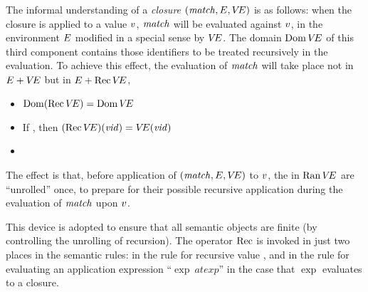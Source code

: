 The informal understanding of a {\sl {} closure} $({\it match},E,\mbox{$V\!E$})$ is as follows:
when the  closure is applied to a value $v$,
${\it match}$ will be evaluated against $v$, in the environment $E$ modified in
a special sense by
$\mbox{$V\!E$}$.  The domain $\mathop{\rm Dom}\nolimits\mbox{$V\!E$}$ of this third component contains those identifiers to be treated recursively in the evaluation.  To achieve this
effect, the evaluation of ${\it match}$ will take place not in $E + \mbox{$V\!E$}$
but in $E + \mathop{\rm Rec}\nolimits\mbox{$V\!E$}$,
\medskip

\begin{itemize}
\item $\mathop{\rm Dom}\nolimits(\mathop{\rm Rec}\nolimits\mbox{$V\!E$})=\mathop{\rm Dom}\nolimits\mbox{$V\!E$} $
\item If \replacement{\theidstatus}{$\VE(\var)\notin\Closure$}{$\VE(\vid)\notin\FcnClosure\times\{\isv\}$},
then $(\mathop{\rm Rec}\nolimits\mbox{$V\!E$})({\it vid})=\mbox{$V\!E$}({\it vid})$
\item {}
\end{itemize}
The effect is that, before application of $({\it match},E,\mbox{$V\!E$})$ to $v$, the
in $\mathop{\rm Ran}\nolimits\mbox{$V\!E$}$ are ``unrolled'' once, to prepare for their possible
recursive application during the evaluation of ${\it match}$ upon $v$.

This device is adopted to ensure that all semantic objects are finite (by
controlling the unrolling of recursion).  The operator $\mathop{\rm Rec}\nolimits$ is invoked in
just two places in the semantic rules: in the rule for recursive value
, and in the rule for evaluating
an application expression ``$\exp\ atexp$'' in the case that $\exp$
evaluates to a  closure.

